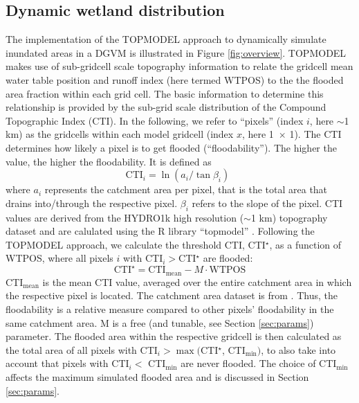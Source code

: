 \subsection{Dynamic wetland distribution}
The implementation of the TOPMODEL approach to dynamically simulate inundated areas in a DGVM is illustrated in Figure \ref{fig:overview}. TOPMODEL makes use of sub-gridcell scale topography information to relate the gridcell mean water table position and runoff index (here termed WTPOS) to the the flooded area fraction within each grid cell. The basic information to determine this relationship is provided by the sub-grid scale distribution of the Compound Topographic Index (CTI). In the following, we refer to ``pixels'' (index $i$, here $\sim$1 km) as the gridcells within each model gridcell (index $x$, here 1\degrees\ $\times$ 1\degrees ). The CTI determines how likely a pixel is to get flooded (``floodability''). The higher the value, the higher the floodability. It is defined as 
\begin{equation}
  \text{CTI}_i = \ln (a_i/\tan\beta_i)\;\,
\end{equation}
where $a_i$ represents the catchment area per pixel, that is the total area that drains into/through the respective pixel. $\beta_i$ refers to the slope of the pixel. CTI values are derived from the HYDRO1k high resolution ($\sim$1 km) topography dataset \citep{hydro1k} and are calulated using the R library ``topmodel'' \citep{rtopmodel}. Following the TOPMODEL approach, we calculate the threshold CTI, CTI$^{\star}$, as a function of WTPOS, where all pixels $i$ with CTI$_i >$CTI$^{\star}$ are flooded:
\begin{equation}
\text{CTI}^{\star} = \text{CTI}_{\text{mean}} - M \cdot \text{WTPOS}
\label{eq:topm}
\end{equation}
CTI$_{\text{mean}}$ is the mean CTI value, averaged over the entire catchment area in which the respective pixel is located. The catchment area dataset is from \citet{hydro1k}. Thus, the floodability is a relative measure compared to other pixels' floodability in the same catchment area. M is a free (and tunable, see Section \ref{sec:params}) parameter. The flooded area within the respective gridcell is then calculated as the total area of all pixels with CTI$_i >\max($CTI$^{\star}$, CTI$_{\text{min}})$, to also take into account that pixels with CTI$_i<$ CTI$_{\text{min}}$ are never flooded. The choice of CTI$_{\text{min}}$ affects the maximum simulated flooded area and is discussed in Section \ref{sec:params}.\\

